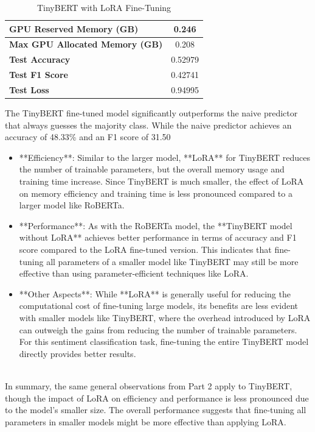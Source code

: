 \documentclass[11pt, oneside]{article}   	%
\begin{document}
\begin{table}[h!]
\begin{minipage}{0.45\textwidth}
\begin{tabular}{|l|c|}
        \textbf{GPU Reserved Memory (GB)}          & 0.246              \\ \hline
        \textbf{Max GPU Allocated Memory (GB)}     & 0.208              \\ \hline
        \textbf{Test Accuracy}                     & 0.52979            \\ \hline
        \textbf{Test F1 Score}                     & 0.42741            \\ \hline
        \textbf{Test Loss}                         & 0.94995            \\ \hline
        \end{tabular}
        \caption{TinyBERT with LoRA Fine-Tuning}
    \end{minipage}
\end{table}

The TinyBERT fine-tuned model significantly outperforms the naive predictor that always guesses the majority class. While the naive predictor achieves an accuracy of 48.33\% and an F1 score of 31.50%
\\
\begin{itemize}
    \item **Efficiency**: Similar to the larger model, **LoRA** for TinyBERT reduces the number of trainable parameters, but the overall memory usage and training time increase. Since TinyBERT is much smaller, the effect of LoRA on memory efficiency and training time is less pronounced compared to a larger model like RoBERTa.
    \item **Performance**: As with the RoBERTa model, the **TinyBERT model without LoRA** achieves better performance in terms of accuracy and F1 score compared to the LoRA fine-tuned version. This indicates that fine-tuning all parameters of a smaller model like TinyBERT may still be more effective than using parameter-efficient techniques like LoRA.
    \item **Other Aspects**: While **LoRA** is generally useful for reducing the computational cost of fine-tuning large models, its benefits are less evident with smaller models like TinyBERT, where the overhead introduced by LoRA can outweigh the gains from reducing the number of trainable parameters. For this sentiment classification task, fine-tuning the entire TinyBERT model directly provides better results.
\end{itemize}
\\
In summary, the same general observations from Part 2 apply to TinyBERT, though the impact of LoRA on efficiency and performance is less pronounced due to the model's smaller size. The overall performance suggests that fine-tuning all parameters in smaller models might be more effective than applying LoRA.
\end{document}
